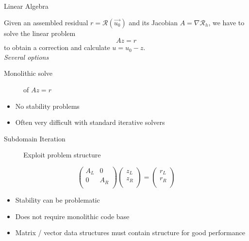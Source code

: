 \documentclass[ignorenonframetext,11pt]{beamer}
\theoremstyle{definition}
\begin{document}
\begin{frame}{Linear Algebra}

    Given an assembled residual $r = \mathcal{R}(\vec{u_0})$ and its Jacobian $A = \nabla\mathcal{R}_h$, we have to solve the linear problem
    \begin{equation*}
      A z = r
    \end{equation*}
    to obtain a correction and calculate $u = u_0 - z$.\\
  \emph{Several options}
  \begin{description}
  \item[Monolithic solve] of $A z = r$
  \end{description}
  \begin{itemize}
  \item No stability problems
  \item Often very difficult with standard iterative solvers
  \end{itemize}
  \begin{description}
  \item[Subdomain Iteration] Exploit problem structure
  \end{description}
\begin{equation*}
  \begin{pmatrix}
    A_L & 0 \\
    0  & A_R \\
  \end{pmatrix}
  \begin{pmatrix}
    z_L \\ z_R \\
  \end{pmatrix}
  =
  \begin{pmatrix}
    r_L \\ r_R \\
  \end{pmatrix}
\end{equation*}
\begin{itemize}
\item Stability can be problematic
\item Does not require monolithic code base
\item Matrix / vector data structures must contain structure for good performance
\end{itemize}
\end{frame}
\end{document}

